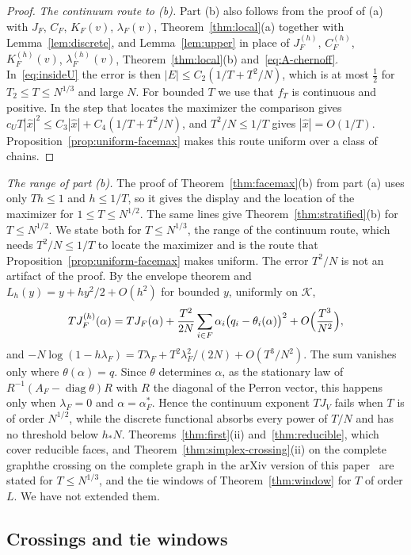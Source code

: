 \begin{proof}
\emph{The continuum route to (b).} Part (b) also follows from the proof of (a)
with $J_F$, $C_F$, $K_F(v)$, $\lambda_F(v)$, Theorem~\ref{thm:local}(a) together
with Lemma~\ref{lem:discrete}, and Lemma~\ref{lem:upper} in place of $J^{(h)}_F$,
$C^{(h)}_F$, $K^{(h)}_F(v)$, $\lambda^{(h)}_F(v)$, Theorem~\ref{thm:local}(b)
and~\eqref{eq:A-chernoff}. In~\eqref{eq:insideU} the error is then
$|E|\le C_2(1/T+T^2/N)$, which is at most $\frac12$ for $T_2\le T\le N^{1/3}$ and large $N$.
For bounded $T$ we use that $f_T$ is continuous and positive. In the step that locates the
maximizer the comparison gives $c_UT|\hat x|^2\le C_3|\hat x|+C_4(1/T+T^2/N)$, and
$T^2/N\le1/T$ gives $|\hat x|=O(1/T)$. Proposition~\ref{prop:uniform-facemax} makes this
route uniform over a class of chains.
\end{proof}

\emph{The range of part (b).} The proof of Theorem~\ref{thm:facemax}(b) from part (a)
uses only $Th\le1$ and $h\le1/T$, so it gives the display and the location of the
maximizer for $1\le T\le N^{1/2}$. The same lines give Theorem~\ref{thm:stratified}(b)
for $T\le N^{1/2}$. We state both for $T\le N^{1/3}$, the range of the continuum route,
which needs $T^2/N\le1/T$ to locate the maximizer and is the route that
Proposition~\ref{prop:uniform-facemax} makes uniform. The error $T^2/N$ is not an
artifact of the proof. By the envelope theorem and $L_h(y)=y+hy^2/2+O(h^2)$ for bounded $y$,
uniformly on $\mathcal K$,
\[
 TJ^{(h)}_F(\alpha)=TJ_F(\alpha)+\frac{T^2}{2N}\sum_{i\in F}\alpha_i\bigl(q_i-\theta_i(\alpha)\bigr)^2
 +O\Bigl(\frac{T^3}{N^2}\Bigr),
\]
and $-N\log(1-h\lambda_F)=T\lambda_F+T^2\lambda_F^2/(2N)+O(T^3/N^2)$. The sum
vanishes only where $\theta(\alpha)=q$. Since $\theta$ determines $\alpha$, as the
stationary law of $R^{-1}(A_F-\operatorname{diag}\theta)R$ with $R$ the diagonal of
the Perron vector, this happens only when $\lambda_F=0$ and $\alpha=\alpha^*_F$. Hence
the continuum exponent $TJ_V$ fails when $T$ is of order $N^{1/2}$, while the
discrete functional absorbs every power of $T/N$ and has no threshold below $h_*N$.
Theorems~\ref{thm:first}(ii) and~\ref{thm:reducible}, which cover reducible faces, and
\ifarxivbuild Theorem~\ref{thm:simplex-crossing}(ii) on the complete graph\else the crossing on the
complete graph in the arXiv version of this paper~\cite{arxivC1}\fi{} are stated for
$T\le N^{1/3}$, and the tie windows of Theorem~\ref{thm:window} for $T$ of order
$L$. We have not extended them.

\subsection{Crossings and tie windows}\label{sec:crossings}

